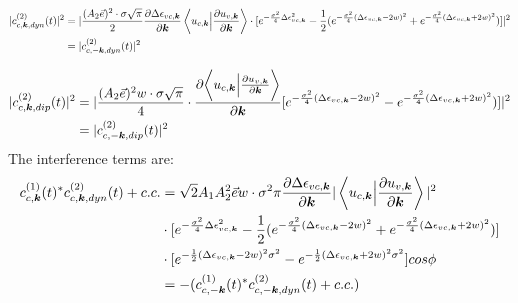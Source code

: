 \begin{equation}
\begin{aligned}
  |c^{(2)}_{c,\boldsymbol k,dyn}(t)|^2&= \lvert \frac{(A_2 \vec e)^2 \cdot \sigma \sqrt{\pi}}{2} \frac{\partial  \Delta \epsilon_{vc,\boldsymbol k}}{\partial \boldsymbol k} \left \langle u_{c,\boldsymbol k}\Big |\frac{\partial u_{v,\boldsymbol k}}{\partial \boldsymbol k} \right \rangle 
    \cdot [e^{-\frac{\sigma^2}{4} \Delta \epsilon_{vc,\boldsymbol k} ^2}-\frac{1}{2}(e^{-\frac{\sigma^2}{4} (\Delta \epsilon_{vc,\boldsymbol k}-2w)^2}+e^{-\frac{\sigma^2}{4} (\Delta \epsilon_{vc,\boldsymbol k}+2w)^2})] \rvert^2\\
    &=|c^{(2)}_{c,-\boldsymbol k,dyn}(t)|^2
\end{aligned}
\end{equation}

\begin{equation}
\begin{aligned}
  |c^{(2)}_{c,\boldsymbol k,dip}(t)|^2&= \lvert \frac{(A_2 \vec e)^2 w \cdot \sigma \sqrt{\pi}}{4} \cdot \frac{\partial{\left \langle u_{c,\boldsymbol k}\Big |\frac{\partial u_{v,\boldsymbol k}}{\partial \boldsymbol k} \right \rangle}}{\partial {\boldsymbol k}}  [e^{-\frac{\sigma^2}{4} (\Delta \epsilon_{vc,\boldsymbol k}-2w)^2}-e^{-\frac{\sigma^2}{4} (\Delta \epsilon_{vc,\boldsymbol k}+2w)^2})] \rvert^2\\
  &=  |c^{(2)}_{c,-\boldsymbol k,dip}(t)|^2
\end{aligned}
\end{equation}
The interference terms are:
\begin{equation}
\begin{aligned}
    c^{(1)}_{c,\boldsymbol k}(t)^* c^{(2)}_{c,\boldsymbol k,dyn}(t) +c.c.&=
   \sqrt{2} A_1 A_2^2 \vec e w \cdot \sigma^2 \pi \frac{\partial  \Delta \epsilon_{vc,\boldsymbol k}}{\partial \boldsymbol k} |\left \langle u_{c,\boldsymbol k}\Big |\frac{\partial u_{v,\boldsymbol k}}{\partial \boldsymbol k} \right \rangle|^2 \\
    &\cdot [e^{-\frac{\sigma^2}{4} \Delta \epsilon_{vc,\boldsymbol k} ^2}-\frac{1}{2}(e^{-\frac{\sigma^2}{4} (\Delta \epsilon_{vc,\boldsymbol k}-2w)^2}+e^{-\frac{\sigma^2}{4} (\Delta \epsilon_{vc,\boldsymbol k}+2w)^2})]\\
    &\cdot[e^{-\frac{1}2{}(\Delta \epsilon_{vc,\boldsymbol k} - 2w)^2 \sigma^2}
    -e^{-\frac{1}{2}(\Delta \epsilon_{vc,\boldsymbol k} + 2w)^2 \sigma^2}
    ]cos\phi\\
    &= -(c^{(1)}_{c,-\boldsymbol k}(t)^* c^{(2)}_{c,-\boldsymbol k,dyn}(t) +c.c.)
\end{aligned}
\end{equation}

